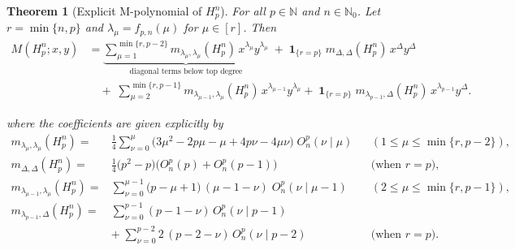 \documentclass[letterpaper,12pt]{article}
\newtheorem{theorem}{Theorem}
\begin{document}
\begin{theorem}[Explicit M-polynomial of $H_p^n$]
\label{thm:Mpoly} For all $p \in \mathbb{N}$ and $n \in \mathbb{N}_0$. 
Let $r=\min\{n,p\}$ and $\lambda_\mu=f_{p,n}(\mu)$ for $\mu\in[r]$.
Then
\begin{equation}
    \begin{aligned}
M(H_p^n;x,y)
&=
\underbrace{\sum_{\mu=1}^{\min\{r,p-2\}}
m_{\lambda_\mu,\lambda_\mu}(H_p^n)\,x^{\lambda_\mu}y^{\lambda_\mu}}_{\text{diagonal terms below top degree}}
\;+\;
\mathbf{1}_{\{r=p\}}\; m_{\Delta,\Delta}(H_p^n)\,x^\Delta y^\Delta
\\[1mm]
&\quad
+\;\sum_{\mu=2}^{\min\{r,p-1\}}
m_{\lambda_{\mu-1},\lambda_\mu}(H_p^n)\,x^{\lambda_{\mu-1}}y^{\lambda_\mu}+\;\mathbf{1}_{\{r=p\}}\; m_{\lambda_{p-1},\Delta}(H_p^n)\,x^{\lambda_{p-1}}y^{\Delta}.
\end{aligned}
\end{equation}


where the coefficients are given explicitly by
\[
\begin{aligned}
    m_{\lambda_\mu,\lambda_\mu}(H_p^n)
=&
\frac14\sum_{\nu=0}^{\mu}
\Big(3\mu^2-2p\mu-\mu+4p\nu-4\mu\nu\Big)\; O_n^p(\nu\mid \mu)
&& (1\le \mu\le \min\{r,p-2\}),\\
m_{\Delta,\Delta}(H_p^n)
=&
\frac14\Big(p^2-p\Big)\Big( O_n^p(p)+O_n^p(p-1)\Big)
&&\text{(when $r=p$)},\\
m_{\lambda_{\mu-1},\lambda_\mu}(H_p^n)
=&
\sum_{\nu=0}^{\mu-1}\big(p-\mu+1\big)\,(\mu-1-\nu)\; O_n^p(\nu\mid \mu-1)
&& (2\le \mu\le \min\{r,p-1\}),\\
m_{\lambda_{p-1},\Delta}(H_p^n)
=&
\sum_{\nu=0}^{p-1}(p-1-\nu)\,O_n^p(\nu\mid p-1)
\; &&  \\
&+\;
\sum_{\nu=0}^{p-2} 2\,(p-2-\nu)\,O_n^p(\nu\mid p-2)
&& \text{(when $r=p$)}. 
\end{aligned}
\]
\end{theorem}
\end{document}
